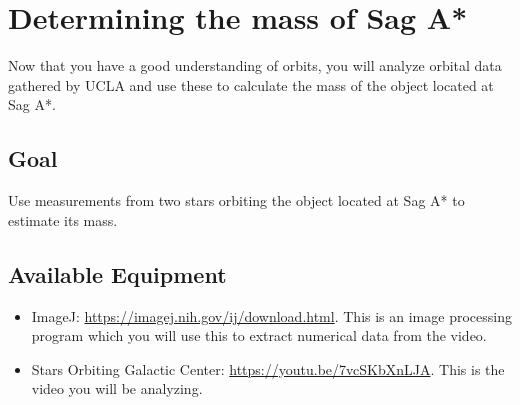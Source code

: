 	

\section{Determining the mass of Sag A*}
Now that you have a good understanding of orbits, you will analyze orbital data gathered by UCLA and use these to calculate the mass of the object located at Sag A*.

\subsection{Goal}

Use measurements from two stars orbiting the object located at Sag A* to estimate its mass. 

\subsection{Available Equipment}
\begin{itemize}
	\item ImageJ: \url{https://imagej.nih.gov/ij/download.html}. This is an image processing program which you will use this to extract numerical data from the video.
	\item Stars Orbiting Galactic Center: \url{https://youtu.be/7vcSKbXnLJA}. This is the video you will be analyzing.
\end{itemize}

